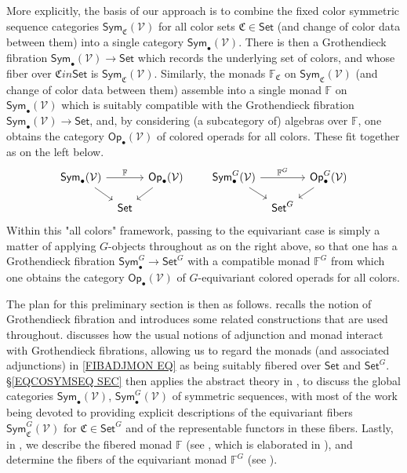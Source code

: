 \documentclass[a4paper,10pt
,draft
]{article}%
\numberwithin{equation}{section}
\numberwithin{figure}{section}
\theoremstyle{definition} %
\newcommand{\Sym}{\ensuremath{\mathsf{Sym}}}%
\newcommand{\Op}{\mathsf{Op}}%
\newcommand{\V}{\ensuremath{\mathcal V}}
\newcommand{\1}{\ensuremath{\mathbbm 1}}%
\begin{document}
More explicitly, the basis of our approach is to combine the 
fixed color symmetric sequence categories
$\mathsf{Sym}_{\mathfrak{C}}(\V)$ for all color sets 
$\mathfrak{C} \in \mathsf{Set}$
(and change of color data between them)
into a single category $\mathsf{Sym}_{\bullet}(\V)$.
There is then a Grothendieck fibration
$\mathsf{Sym}_{\bullet}(\V) \to \mathsf{Set}$
which records the underlying set of colors,
and whose fiber over $\mathfrak{C} in \mathsf{Set}$ is 
$\mathsf{Sym}_{\mathfrak{C}}(\V)$.
Similarly, the monads $\mathbb{F}_{\mathfrak{C}}$
on $\mathsf{Sym}_{\mathfrak{C}}(\mathcal{V})$
(and change of color data between them) 
assemble into a single monad $\mathbb{F}$
on $\mathsf{Sym}_{\bullet}(\V)$
which is suitably compatible with 
the Grothendieck fibration 
$\mathsf{Sym}_{\bullet}(\V) \to \mathsf{Set}$,
and, by considering (a subcategory of) algebras over $\mathbb{F}$,
one obtains the category $\mathsf{Op}_{\bullet}(\V)$
of colored operads for all colors.
These fit together as on the left below.
\begin{equation}\label{FIBADJMON EQ}
\begin{tikzcd}[row sep = small, column sep = tiny]
\Sym_\bullet(\V) \arrow[rr, "\mathbb F"] \arrow[dr]
&&
\Op_\bullet(\V) \arrow[dl]
&&& %
\Sym^G_\bullet(\V) \arrow[rr, "\mathbb F^G"] \arrow[dr]
&&
\Op^G_\bullet(\V) \arrow[dl]
\\
&
\mathsf{Set}
&
&&& %
&
\mathsf{Set}^G
\end{tikzcd}
\end{equation}
Within this "all colors" framework, passing to the equivariant case is simply a matter of applying $G$-objects throughout as on the right above, 
so that one has a Grothendieck fibration
$\mathsf{Sym}_{\bullet}^G \to \mathsf{Set}^G$
with a compatible monad $\mathbb{F}^G$
from which one obtains the category 
$\mathsf{Op}_{\bullet}(\V)$
of $G$-equivariant colored operads for all colors. 


The plan for this preliminary section is then as follows.
%
\cite[\S \ref{OC-GROTFIB SEC}]{BP_FCOP} recalls the notion of Grothendieck fibration and
introduces some related constructions that are used throughout.
%
\cite[\S \ref{OC-FIBCAT_SEC}]{BP_FCOP} discusses how the usual notions of adjunction and monad interact with Grothendieck fibrations,
allowing us to regard the monads
(and associated adjunctions)
in \eqref{FIBADJMON EQ}
as being suitably fibered over $\mathsf{Set}$ and $\mathsf{Set}^G$.
%
\S \ref{EQCOSYMSEQ SEC} then applies the abstract theory in 
\cite[\S \ref{OC-GROTFIB SEC}]{BP_FCOP},
\cite[\S \ref{OC-FIBCAT_SEC}]{BP_FCOP}
to discuss the global categories
$\mathsf{Sym}_{\bullet}(\V)$,
$\mathsf{Sym}^G_{\bullet}(\V)$
of symmetric sequences, 
with most of the work being devoted to providing 
explicit descriptions of the equivariant fibers
$\mathsf{Sym}^G_{\mathfrak{C}}(\V)$
for $\mathfrak{C} \in \mathsf{Set}^G$
and of the representable functors in these fibers.
%
Lastly, in \cite[\S \ref{OC-EQCOSYMOP SEC}]{BP_FCOP}, 
we describe the fibered monad $\mathbb F$ 
(see \cite[\eqref{OC-FREEOP_EQ}]{BP_FCOP}, which is elaborated in 
\cite[App. \ref{OC-MONAD_APDX}]{BP_FCOP}),
and determine the fibers of the equivariant monad $\mathbb F^G$ (see \cite[\eqref{OC-FGC_EQ}]{BP_FCOP}).
\end{document}
